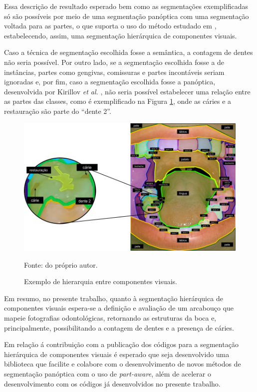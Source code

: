 Essa descrição de resultado esperado bem como as segmentações exemplificadas só são possíveis por meio de uma segmentação panóptica com uma segmentação voltada para as partes, o que suporta o uso do método estudado em \cite{DeGeus2021}, estabelecendo, assim, uma segmentação hierárquica de componentes visuais.

Caso a técnica de segmentação escolhida fosse a semântica, a contagem de dentes não seria possível. Por outro lado, se a segmentação escolhida fosse a de instâncias, partes como gengivas, comissuras e partes incontáveis seriam ignoradas e, por fim, caso a segmentação escolhida fosse a panóptica, desenvolvida por Kirillov \textit{et al.} \cite{Kirillov2019a}, não seria possível estabelecer uma relação entre as partes das classes, como é exemplificado na Figura \ref{proposal:expres:fig:6}, onde as cáries e a restauração são parte do ``dente 2''.

\begin{figure}[H]
    \centering
    \caption{Exemplo de hierarquia entre componentes visuais.}
    \includegraphics[width=1\textwidth]{recursos/imagens/proposal/segmentada.png}
    \label{proposal:expres:fig:6}

    Fonte: do próprio autor.
\end{figure}

Em resumo, no presente trabalho, quanto à segmentação hierárquica de componentes visuais espera-se a definição e avaliação de um arcabouço que mapeie fotografias odontológicas, retornando as estruturas da boca e, principalmente, possibilitando a contagem de dentes e a presença de cáries.
 
Em relação á contribuição com a publicação dos códigos para a segmentação hierárquica de componentes visuais é esperado que seja desenvolvido uma biblioteca que facilite e colabore com o desenvolvimento de novos métodos de segmentação panóptica com o uso de \textit{part-aware}, além de acelerar o desenvolvimento com os códigos já desenvolvidos no presente trabalho.

